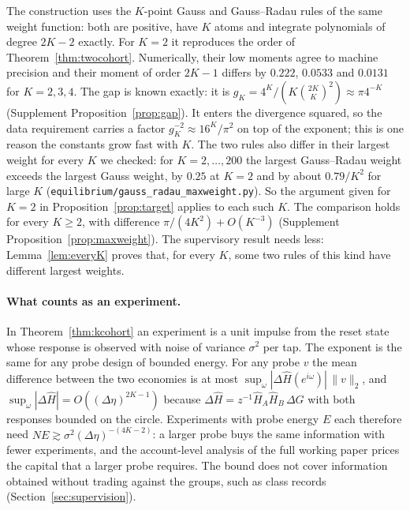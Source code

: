 \documentclass[12pt]{article}
\theoremstyle{definition}
\theoremstyle{remark}
\begin{document}
The construction uses the $K$-point Gauss and Gauss--Radau rules of the same weight function: both are positive, have $K$ atoms and integrate polynomials of degree $2K-2$ exactly. For $K=2$ it reproduces the order of Theorem~\ref{thm:twocohort}. Numerically, their low moments agree to machine precision and their moment of order $2K-1$ differs by $0.222$, $0.0533$ and $0.0131$ for $K=2,3,4$. The gap is known exactly: it is $g_K=4^K/(K\binom{2K}{K}^2)\approx\pi4^{-K}$ (Supplement Proposition~\ref{prop:gap}). It enters the divergence squared, so the data requirement carries a factor $g_K^{-2}\approx16^K/\pi^2$ on top of the exponent; this is one reason the constants grow fast with $K$. The two rules also differ in their largest weight for every $K$ we checked: for $K=2,\ldots,200$ the largest Gauss--Radau weight exceeds the largest Gauss weight, by $0.25$ at $K=2$ and by about $0.79/K^2$ for large $K$ (\nolinkurl{equilibrium/gauss_radau_maxweight.py}). So the argument given for $K=2$ in Proposition~\ref{prop:target} applies to each such $K$. The comparison holds for every $K\ge2$, with difference $\pi/(4K^2)+O(K^{-3})$ (Supplement Proposition~\ref{prop:maxweight}). The supervisory result needs less: Lemma~\ref{lem:everyK} proves that, for every $K$, some two rules of this kind have different largest weights.

\paragraph{What counts as an experiment.} In Theorem~\ref{thm:kcohort} an experiment is a unit impulse from the reset state whose response is observed with noise of variance $\sigma^2$ per tap. The exponent is the same for any probe design of bounded energy. For any probe $v$ the mean difference between the two economies is at most $\sup_\omega|\Delta\hat H(e^{i\omega})|\,\|v\|_2$, and $\sup_\omega|\Delta\hat H|=O((\Delta\eta)^{2K-1})$ because $\Delta\hat H=z^{-1}\hat H_A\hat H_B\,\Delta G$ with both responses bounded on the circle. Experiments with probe energy $E$ each therefore need $NE\gtrsim\sigma^2(\Delta\eta)^{-(4K-2)}$: a larger probe buys the same information with fewer experiments, and the account-level analysis of the full working paper prices the capital that a larger probe requires. The bound does not cover information obtained without trading against the groups, such as class records (Section~\ref{sec:supervision}).
\end{document}
